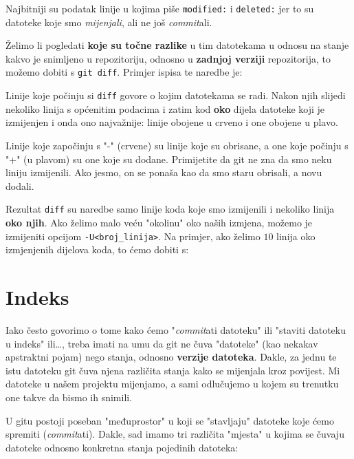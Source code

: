 

Najbitniji su podatak linije u kojima piše \verb+modified:+ i \verb+deleted:+ jer to su datoteke koje smo \emph{mijenjali}, ali ne još \emph{commit}ali.

Želimo li pogledati \textbf{koje su točne razlike} u tim datotekama u odnosu na stanje kakvo je snimljeno u repozitoriju, odnosno u \textbf{zadnjoj verziji} repozitorija, to možemo dobiti s \verb+git diff+. 
Primjer ispisa te naredbe je:



Linije koje počinju si \verb+diff+ govore o kojim datotekama se radi.
Nakon njih slijedi nekoliko linija s općenitim podacima i zatim kod \textbf{oko} dijela datoteke koji je izmijenjen i onda ono najvažnije: linije obojene u crveno i one obojene u plavo.

Linije koje započinju s "-" (crvene) su linije koje su obrisane, a one koje počinju s "+" (u plavom) su one koje su dodane. 
Primijetite da git ne zna da smo neku liniju izmijenili. 
Ako jesmo, on se ponaša kao da smo staru obrisali, a novu dodali.

Rezultat \verb+diff+ su naredbe samo linije koda koje smo izmijenili i nekoliko linija \textbf{oko njih}.
Ako želimo malo veću "okolinu" oko naših izmjena, možemo je izmijeniti opcijom \verb+-U<broj_linija>+.
Na primjer, ako želimo $10$ linija oko izmjenjenih dijelova koda, to ćemo dobiti s:


\section*{Indeks}

Iako često govorimo o tome kako ćemo "\emph{commit}ati datoteku" ili "staviti datoteku u indeks" ili\dots, treba imati na umu da git ne čuva "datoteke" (kao nekakav apstraktni pojam) nego stanja, odnosno \textbf{verzije datoteka}.
Dakle, za jednu te istu datoteku git čuva njena različita stanja kako se mijenjala kroz povijest.
Mi datoteke u našem projektu mijenjamo, a sami odlučujemo u kojem su trenutku one takve da bismo ih snimili.

U gitu postoji poseban "međuprostor" u koji se "stavljaju" datoteke koje ćemo spremiti (\emph{commit}ati).
Dakle, sad imamo tri različita "mjesta" u kojima se čuvaju datoteke odnosno konkretna stanja pojedinih datoteka:

